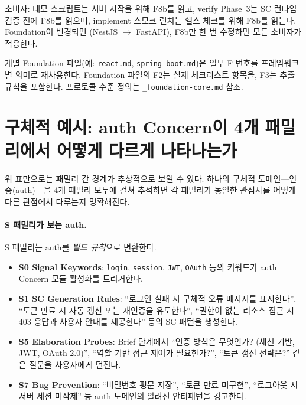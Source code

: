 \documentclass[11pt,a4paper,openright,twoside]{report}
\begin{document}
소비자: 데모 스크립트는 서버 시작을 위해 F8b를 읽고, verify Phase~3는 SC 런타임 검증 전에 F8b를 읽으며, implement 스모크 런치는 헬스 체크를 위해 F8b를 읽는다. Foundation이 변경되면 (NestJS $\rightarrow$ FastAPI), F8b만 한 번 수정하면 모든 소비자가 적응한다.

\begin{notebox}
개별 Foundation 파일(예: \texttt{react.md}, \texttt{spring-boot.md})은 일부 F 번호를 프레임워크별 의미로 재사용한다. Foundation 파일의 F2는 실제 체크리스트 항목을, F3는 추출 규칙을 포함한다. 프로토콜 수준 정의는 \texttt{\_foundation-core.md} 참조.
\end{notebox}

\section{구체적 예시: auth Concern이 4개 패밀리에서 어떻게 다르게 나타나는가}
\label{sec:auth-across-families}

위 표만으로는 패밀리 간 경계가 추상적으로 보일 수 있다. 하나의 구체적 도메인---인증(auth)---을 4개 패밀리 모두에 걸쳐 추적하면 각 패밀리가 동일한 관심사를 어떻게 다른 관점에서 다루는지 명확해진다.

\paragraph{S 패밀리가 보는 auth.}
S 패밀리는 auth를 \emph{빌드 규칙}으로 변환한다.
\begin{itemize}
  \item \textbf{S0 Signal Keywords}: \texttt{login}, \texttt{session}, \texttt{JWT}, \texttt{OAuth} 등의 키워드가 auth Concern 모듈 활성화를 트리거한다.
  \item \textbf{S1 SC Generation Rules}: ``로그인 실패 시 구체적 오류 메시지를 표시한다'', ``토큰 만료 시 자동 갱신 또는 재인증을 유도한다'', ``권한이 없는 리소스 접근 시 403 응답과 사용자 안내를 제공한다'' 등의 SC 패턴을 생성한다.
  \item \textbf{S5 Elaboration Probes}: Brief 단계에서 ``인증 방식은 무엇인가? (세션 기반, JWT, OAuth 2.0)'', ``역할 기반 접근 제어가 필요한가?'', ``토큰 갱신 전략은?'' 같은 질문을 사용자에게 던진다.
  \item \textbf{S7 Bug Prevention}: ``비밀번호 평문 저장'', ``토큰 만료 미구현'', ``로그아웃 시 서버 세션 미삭제'' 등 auth 도메인의 알려진 안티패턴을 경고한다.
\end{itemize}
\end{document}

